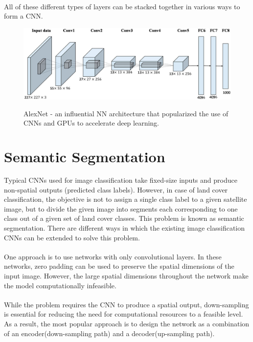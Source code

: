 \documentclass[12pt, a4paper]{report}
\begin{document}
\paragraph{}
All of these different types of layers can be stacked together in various ways to form a CNN.
\begin{figure}[h]
\centering
\includegraphics[width=\textwidth]{cnn3.jpg}
\caption{AlexNet - an influential NN architecture that popularized the use of CNNs and GPUs to accelerate deep learning.}\cite{alexnet, alexnetimg}
\end{figure}

\section{Semantic Segmentation}
Typical CNNs used for image classification take fixed-size inputs and produce non-spatial outputs (predicted class labels). However, in case of land cover classification, the objective is not to assign a single class label to a given satellite image, but to divide the given image into segments each corresponding to one class out of a given set of land cover classes. This problem is known as semantic segmentation. There are different ways in which the existing image classification CNNs can be extended to solve this problem.
\paragraph{}
One approach is to use networks with only convolutional layers. In these networks, zero padding can be used to preserve the spatial dimensions of the input image. However, the large spatial dimensions throughout the network make the model computationally infeasible. \cite{long2015fully, cs231n, unet}
\paragraph{}
While the problem requires the CNN to produce a spatial output, down-sampling is essential for reducing the need for computational resources to a feasible level. As a result, the most popular approach is to design the network as a combination of an encoder(down-sampling path) and a decoder(up-sampling path).\\
\end{document}
